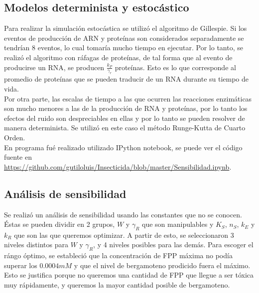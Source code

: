 \documentclass[12pt]{article}
\begin{document}
\subsection{Modelos determinista y estoc\'astico}

Para realizar la simulaci\'on estoc\'astica se utiliz\'o el algoritmo de Gillespie. Si los eventos de producci\'on de ARN y prote\'inas son considerados separadamente se tendr\'ian 8 eventos, lo cual tomar\'ia mucho tiempo en ejecutar. Por lo tanto, se realiz\'o el algoritmo con r\'afagas de prote\'inas, de tal forma que al evento de producirse un RNA, se producen $\frac{k_P}{\gamma_r}$ prote\'inas. Esto es lo que corresponde al promedio de prote\'inas que se pueden traducir de un RNA durante su tiempo de vida.\\

Por otra parte, las escalas de tiempo a las que ocurren las reacciones enzim\'aticas son mucho menores a las de la producci\'on de RNA y prote\'inas, por lo tanto los efectos del ruido son despreciables en ellas y por lo tanto se pueden resolver de manera determinista. Se utiliz\'o en este caso el m\'etodo Runge-Kutta de Cuarto Orden.\\

En programa fu\'e realizado utilizado IPython notebook, se puede ver el c\'odigo fuente en \url{https://github.com/gutiloluis/Insecticida/blob/master/Sensibilidad.ipynb}.

\subsection{An\'alisis de sensibilidad}
Se realiz\'o un an\'alisis de sensibilidad usando las constantes que no se conocen. \'Estas se pueden dividir en 2 grupos, $W$ y $\gamma_R$ que son manipulables y $K_S$, $n_S$, $k_E$ y $k_R$ que son las que queremos optimizar. A partir de esto, se seleccionaron 3 niveles distintos para $W$ y $\gamma_R$, y 4 niveles posibles para las dem\'as. Para escoger el r\'ango \'optimo, se estableci\'o que la concentraci\'on de FPP m\'axima no pod\'ia superar los $0.0004 mM$ y que el nivel de bergamoteno prodicido fuera el m\'aximo. Esto se justifica porque no queremos una cantidad de FPP que llegue a ser t\'oxica muy r\'apidamente, y queremos la mayor cantidad posible de bergamoteno.\\
\end{document}
